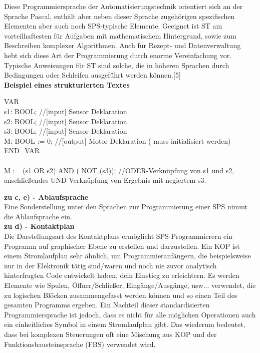 	Diese Programmiersprache der Automatisierungstechnik orientiert sich an der Sprache Pascal, enthält aber neben dieser Sprache zugehörigen spezifischen Elementen aber auch noch SPS-typische Elemente. Geeignet ist ST am vorteilhaftesten für Aufgaben mit mathematischem Hintergrund, sowie zum Beschreiben komplexer Algorithmen. Auch für Rezept- und Datenverwaltung hebt sich diese Art der Programmierung durch enorme Vereinfachung vor. Typische Anweisungen für ST sind solche, die in höheren Sprachen durch Bedingungen oder Schleifen ausgeführt werden können.[5]\\
	
	\textbf{Beispiel eines strukturierten Textes}
	\begin{framed}
	VAR\\
	s1: BOOL; \color{gray}//[input] Sensor Deklaration\\ \color{black}
	s2: BOOL; \color{gray}//[input] Sensor Deklaration\\ \color{black}
	s3: BOOL; \color{gray}//[input] Sensor Deklaration\\ \color{black}
	M: BOOL := 0; \color{gray}//[output] Motor Deklaration ( muss initialisiert werden)\\ \color{black}
	END\_VAR\\\\
	M := (s1 OR s2) AND ( NOT (s3)); \color{gray}//ODER-Verknüpfung von s1 und s2, anschließendes UND-Verknüpfung von Ergebnis mit negiertem s3.\color{black}
	\end{framed}


	\textbf{zu c, e) - Ablaufsprache}\\
	
	Eine Sonderstellung unter den Sprachen zur Programmierung einer SPS nimmt die Ablaufsprache ein. \\
	
	\textbf{zu d) - Kontaktplan}\\
	
	Die Darstellungsart des Kontaktplans ermöglicht SPS-Programmierern ein Programm auf graphischer Ebene zu erstellen und darzustellen. Ein KOP ist einem Stromlaufplan sehr ähnlich, um Programmieranfängern, die beispielsweise nur in der Elektronik tätig sind/waren und noch nie zuvor analytisch hinterfragten Code entwickelt haben, dein Einstieg zu erleichtern. Es werden Elemente wie Spulen, Öffner/Schließer, Eingänge/Ausgänge, usw... verwendet, die zu logischen Blöcken zusammengefasst werden können und so einen Teil des gesamten Programms ergeben. Ein Nachteil dieser standardisierten Programmiersprache ist jedoch, dass es nicht für alle möglichen Operationen auch ein einheitliches Symbol in einem Stromlaufplan gibt. Das wiederum bedeutet, dass bei komplexen Steuerungen oft eine Mischung aus KOP und der Funktionsbausteinsprache (FBS) verwendet wird.\\
	

